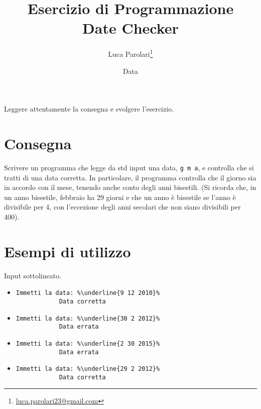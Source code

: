 \documentclass[addpoints,12pt,answers]{exam}
\author{Luca Parolari\footnote{\href{mailto:luca.parolari23@gmail.com}{luca.parolari23@gmail.com}}}
\begin{document}
    
    \title{Esercizio di Programmazione\\ \large Date Checker}
    \date{Data}
    
    \maketitle
    
    Leggere attentamente la consegna e svolgere l'esercizio.
    
    \section{Consegna}
    Scrivere un programma che legge da std input una data, \texttt{g m a}, e controlla che si tratti di una data corretta. In particolare, il programma controlla che il giorno sia in accordo con il mese, tenendo anche conto degli anni bisestili. (Si ricorda che, in un anno bisestile, febbraio ha 29 giorni e che un anno è bisestile se l'anno è divisibile per 4, con l'eccezione degli anni secolari che non siano divisibili per 400).
    
    \section{Esempi di utilizzo}
    Input sottolineato.
    
    \begin{itemize}
    	\item 
			\begin{lstlisting}[style=verbatim]
			Immetti la data: %\underline{9 12 2010}%
			Data corretta
			\end{lstlisting}
			
		\item 
			\begin{lstlisting}[style=verbatim]
			Immetti la data: %\underline{30 2 2012}%
			Data errata
			\end{lstlisting}		
			
		\item
			\begin{lstlisting}[style=verbatim]
			Immetti la data: %\underline{2 30 2015}%
			Data errata
			\end{lstlisting}
			
		\item
			\begin{lstlisting}[style=verbatim]
			Immetti la data: %\underline{29 2 2012}%
			Data corretta
			\end{lstlisting}
    \end{itemize}
    
\end{document}
